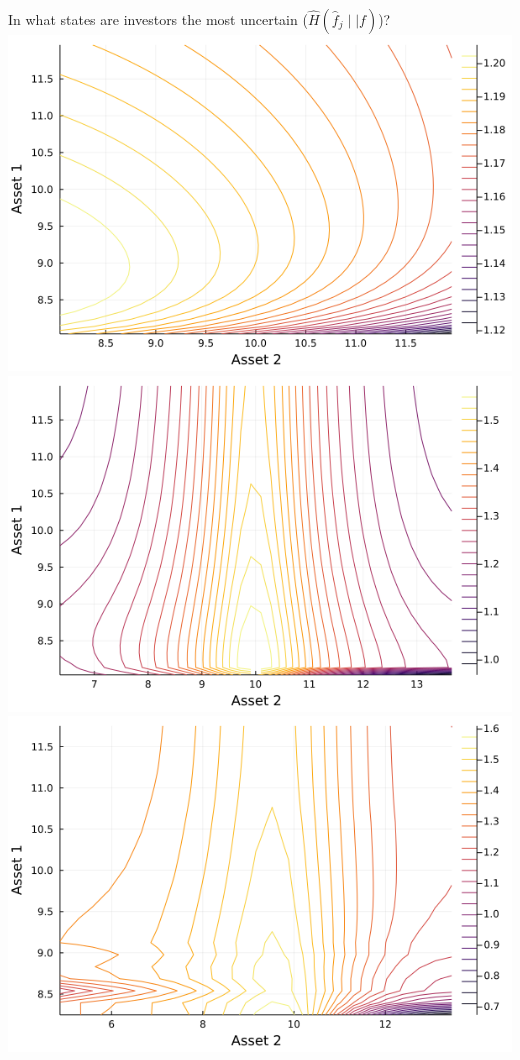 \documentclass[
  ignorenonframetext,
]{beamer}
\begin{document}
\begin{frame}{In what states are investors the most uncertain
(\(\hat H(\hat f_j \mid\mid f)\))?}
\protect\hypertarget{in-what-states-are-investors-the-most-uncertain-hat-hhat-f_j-midmid-f}{}
\includegraphics[width=0.4\paperheight]{complexity_files/figure-beamer/unnamed-chunk-21-1}
\includegraphics[width=0.4\paperheight]{complexity_files/figure-beamer/unnamed-chunk-21-2}
\includegraphics[width=0.4\paperheight]{complexity_files/figure-beamer/unnamed-chunk-21-3}

\end{frame}
\end{document}
